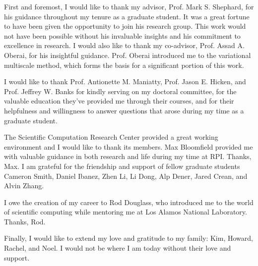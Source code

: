 
First and foremost, I would like to thank my advisor,
Prof. Mark S. Shephard, for his guidance throughout my tenure
as a graduate student. It was a great fortune to have been
given the opportunity to join his research group. This
work would not have been possible without his invaluable
insights and his commitment to excellence in research.
I would also like to thank my co-advisor, Prof. Assad A.
Oberai, for his insightful guidance. Prof. Oberai introduced
me to the variational multiscale method, which forms the
basis for a significant portion of this work.

I would like to thank Prof. Antionette M. Maniatty,
Prof. Jason E. Hicken, and Prof. Jeffrey W. Banks for
kindly serving on my doctoral committee, for the valuable
education they've provided me through their courses,
and for their helpfulness and willingness to answer questions
that arose during my time as a graduate student.

The Scientific Computation Research Center provided a
great working environment and I would like to thank its
members. Max Bloomfield provided me with valuable guidance
in both research and life during my time at RPI. Thanks, Max.
I am grateful for the friendship and support of fellow
graduate students Cameron Smith, Daniel Ibanez, Zhen Li,
Li Dong, Alp Dener, Jared Crean, and Alvin Zhang.

I owe the creation of my career to Rod Douglass, who
introduced me to the world of scientific computing while
mentoring me at Los Alamos National Laboratory.
Thanks, Rod.

Finally, I would like to extend my love and gratitude
to my family: Kim, Howard, Rachel, and Noel. I would not
be where I am today without their love and support.
